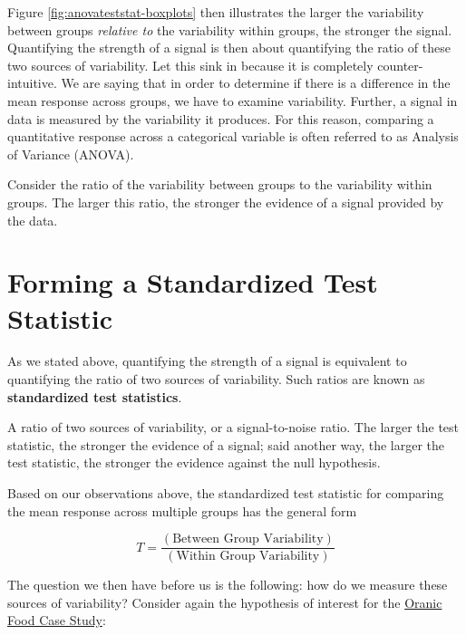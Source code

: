 \documentclass[]{book}
\theoremstyle{definition}
\theoremstyle{definition}
\theoremstyle{remark}
\let\BeginKnitrBlock\begin \let\EndKnitrBlock\end
\begin{document}
Figure \ref{fig:anovateststat-boxplots} then illustrates the larger the
variability between groups \emph{relative to} the variability within
groups, the stronger the signal. Quantifying the strength of a signal is
then about quantifying the ratio of these two sources of variability.
Let this sink in because it is completely counter-intuitive. We are
saying that in order to determine if there is a difference in the mean
response across groups, we have to examine variability. Further, a
signal in data is measured by the variability it produces. For this
reason, comparing a quantitative response across a categorical variable
is often referred to as Analysis of Variance (ANOVA).

\BeginKnitrBlock{rmdkeyidea}
Consider the ratio of the variability between groups to the variability
within groups. The larger this ratio, the stronger the evidence of a
signal provided by the data.
\EndKnitrBlock{rmdkeyidea}

\section{Forming a Standardized Test
Statistic}\label{forming-a-standardized-test-statistic}

As we stated above, quantifying the strength of a signal is equivalent
to quantifying the ratio of two sources of variability. Such ratios are
known as \textbf{standardized test statistics}.

\BeginKnitrBlock{definition}[Standardized Test Statistic]
\protect\hypertarget{def:defn-standardized-test-statistic}{}{\label{def:defn-standardized-test-statistic}
{} }A ratio of two sources of
variability, or a signal-to-noise ratio. The larger the test statistic,
the stronger the evidence of a signal; said another way, the larger the
test statistic, the stronger the evidence against the null hypothesis.
\EndKnitrBlock{definition}

Based on our observations above, the standardized test statistic for
comparing the mean response across multiple groups has the general form

\begin{equation}
  T = \frac{(\text{Between Group Variability})}{(\text{Within Group Variability})}
  \label{eq:general-test-stat}
\end{equation}

The question we then have before us is the following: how do we measure
these sources of variability? Consider again the hypothesis of interest
for the \protect\hyperlink{CaseOrganic}{Oranic Food Case Study}:
\end{document}
